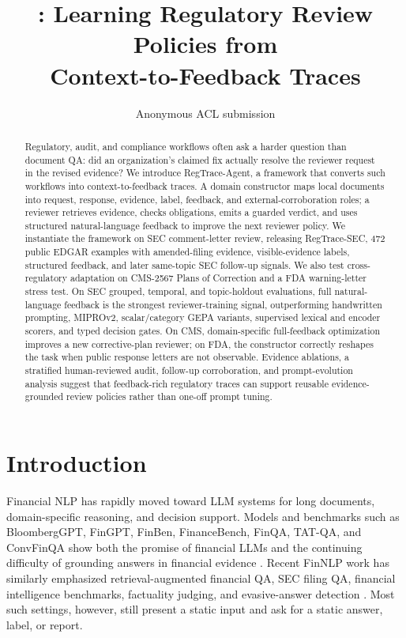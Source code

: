 \documentclass[11pt]{article}
\title{\framework{}: Learning Regulatory Review Policies from\\
Context-to-Feedback Traces}
\author{Anonymous ACL submission}
\newcommand{\dataset}{RegTrace-SEC}
\newcommand{\framework}{RegTrace-Agent}
\begin{document}
\maketitle
\begin{abstract}
Regulatory, audit, and compliance workflows often ask a harder question than document QA: did an organization's claimed fix actually resolve the reviewer request in the revised evidence? We introduce \framework{}, a framework that converts such workflows into context-to-feedback traces. A domain constructor maps local documents into request, response, evidence, label, feedback, and external-corroboration roles; a reviewer retrieves evidence, checks obligations, emits a guarded verdict, and uses structured natural-language feedback to improve the next reviewer policy. We instantiate the framework on SEC comment-letter review, releasing \dataset{}, 472 public EDGAR examples with amended-filing evidence, visible-evidence labels, structured feedback, and later same-topic SEC follow-up signals. We also test cross-regulatory adaptation on CMS-2567 Plans of Correction and a FDA warning-letter stress test. On SEC grouped, temporal, and topic-holdout evaluations, full natural-language feedback is the strongest reviewer-training signal, outperforming handwritten prompting, MIPROv2, scalar/category GEPA variants, supervised lexical and encoder scorers, and typed decision gates. On CMS, domain-specific full-feedback optimization improves a new corrective-plan reviewer; on FDA, the constructor correctly reshapes the task when public response letters are not observable. Evidence ablations, a stratified human-reviewed audit, follow-up corroboration, and prompt-evolution analysis suggest that feedback-rich regulatory traces can support reusable evidence-grounded review policies rather than one-off prompt tuning.
\end{abstract}

\section{Introduction}

Financial NLP has rapidly moved toward LLM systems for long documents, domain-specific reasoning, and decision support. Models and benchmarks such as BloombergGPT, FinGPT, FinBen, FinanceBench, FinQA, TAT-QA, and ConvFinQA show both the promise of financial LLMs and the continuing difficulty of grounding answers in financial evidence \citep{wu2023bloomberggpt,yang2023fingpt,xie2024finben,islam2023financebench,chen2021finqa,zhu2021tatqa,chen2022convfinqa}. Recent FinNLP work has similarly emphasized retrieval-augmented financial QA, SEC filing QA, financial intelligence benchmarks, factuality judging, and evasive-answer detection \citep{lithgow2025rag,lai2025secqa,klimaszewski2025avenibench,wu2025nli,nuaimi2025evasive}. Most such settings, however, still present a static input and ask for a static answer, label, or report.
\end{document}
